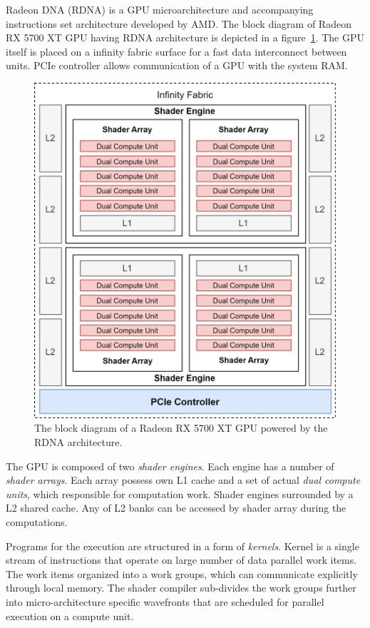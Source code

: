 Radeon DNA (RDNA) is a GPU microarchitecture and accompanying instructions set architecture developed by AMD. The block diagram of Radeon RX 5700 XT GPU having RDNA architecture is depicted in a figure~\ref{fig:rdna_gpu}. The GPU itself is placed on a infinity fabric surface for a fast data interconnect between units. PCIe controller allows communication of a GPU with the system RAM. 

\begin{figure}
    \centering
    \includegraphics[width=1.0\textwidth]{images/rdna_gpu.png}
    \caption{The block diagram of a Radeon RX 5700 XT GPU powered by the RDNA architecture.}
    \label{fig:rdna_gpu}
\end{figure}

The GPU is composed of two \textit{shader engines}. Each engine has a number of \textit{shader arrays}. Each array possess own L1 cache and a set of actual \textit{dual compute units}, which responsible for computation work. Shader engines surrounded by a L2 shared cache. Any of L2 banks can be accessed by shader array during the computations.

Programs for the execution are structured in a form of \textit{kernels}. Kernel is a single stream of instructions that operate on large number of data parallel work items. The work items organized into a work groups, which can communicate explicitly through local memory. The shader compiler sub-divides the work groups further into micro-architecture specific wavefronts that are scheduled for parallel execution on a compute unit.

